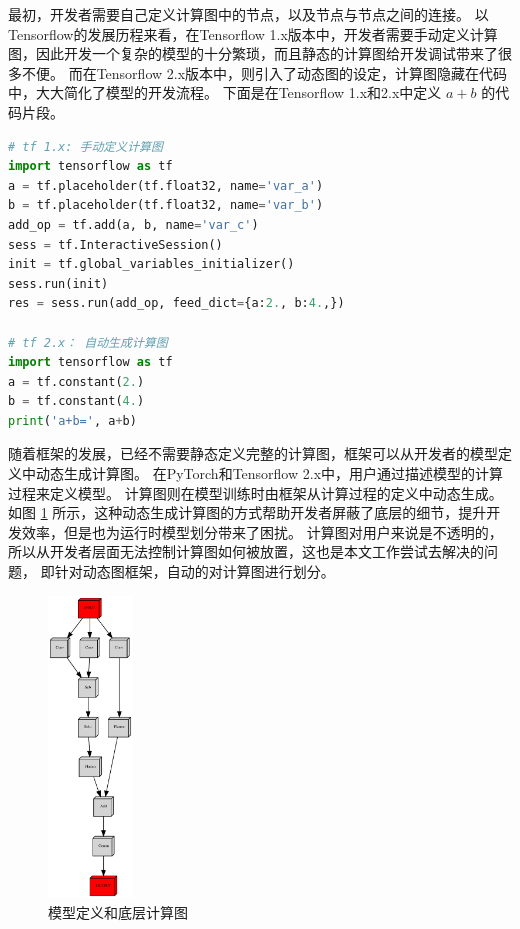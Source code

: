 最初，开发者需要自己定义计算图中的节点，以及节点与节点之间的连接。
以Tensorflow的发展历程来看，在Tensorflow 1.x版本中，开发者需要手动定义计算图，因此开发一个复杂的模型的十分繁琐，而且静态的计算图给开发调试带来了很多不便。
而在Tensorflow 2.x版本中，则引入了动态图的设定，计算图隐藏在代码中，大大简化了模型的开发流程。
下面是在Tensorflow 1.x和2.x中定义 $a+b$ 的代码片段。

\begin{lstlisting}[language=Python, caption={静态图与动态图的比较}]
# tf 1.x: 手动定义计算图
import tensorflow as tf
a = tf.placeholder(tf.float32, name='var_a')
b = tf.placeholder(tf.float32, name='var_b')
add_op = tf.add(a, b, name='var_c')
sess = tf.InteractiveSession()
init = tf.global_variables_initializer()
sess.run(init)
res = sess.run(add_op, feed_dict={a:2., b:4.,})

# tf 2.x： 自动生成计算图
import tensorflow as tf
a = tf.constant(2.)
b = tf.constant(4.)
print('a+b=', a+b)
\end{lstlisting}


随着框架的发展，已经不需要静态定义完整的计算图，框架可以从开发者的模型定义中动态生成计算图。
在PyTorch和Tensorflow 2.x中，用户通过描述模型的计算过程来定义模型。
计算图则在模型训练时由框架从计算过程的定义中动态生成。
如图 \ref{fig:graph} 所示，这种动态生成计算图的方式帮助开发者屏蔽了底层的细节，提升开发效率，但是也为运行时模型划分带来了困扰。
计算图对用户来说是不透明的，所以从开发者层面无法控制计算图如何被放置，这也是本文工作尝试去解决的问题，
即针对动态图框架，自动的对计算图进行划分。

\begin{figure}[htbp]
	\centering
	\begin{minipage}[b]{0.66\textwidth}
	  
	\end{minipage}
	\hfill
	\begin{minipage}[b]{0.3\textwidth}
	  \includegraphics[height=8cm]{./figure/2-background/graph.pdf}
	\end{minipage}
	\caption{模型定义和底层计算图}
	\label{fig:graph}
\end{figure}

